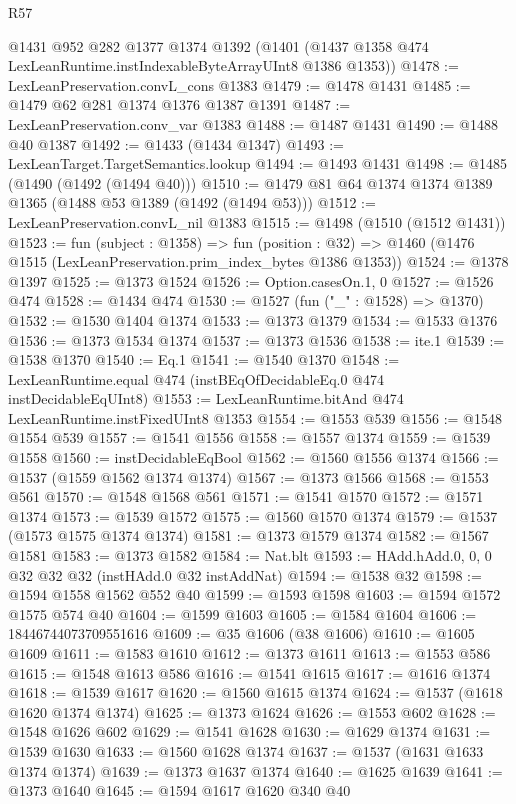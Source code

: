 \begin{lexlean}{R57}
\begin{coremodule}
    @1431
    @952
    @282
    @1377
    @1374
    @1392
    (@1401 (@1437 @1358 @474 LexLeanRuntime.instIndexableByteArrayUInt8 @1386 @1353))
@1478 := LexLeanPreservation.convL_cons @1383
@1479 := @1478 @1431
@1485 := @1479 @62 @281 @1374 @1376 @1387 @1391
@1487 := LexLeanPreservation.conv_var @1383
@1488 := @1487 @1431
@1490 := @1488 @40 @1387
@1492 := @1433 (@1434 @1347)
@1493 := LexLeanTarget.TargetSemantics.lookup
@1494 := @1493 @1431
@1498 := @1485 (@1490 (@1492 (@1494 @40)))
@1510 := @1479 @81 @64 @1374 @1374 @1389 @1365 (@1488 @53 @1389 (@1492 (@1494 @53)))
@1512 := LexLeanPreservation.convL_nil @1383
@1515 := @1498 (@1510 (@1512 @1431))
@1523 := fun (subject : @1358) =>
  fun (position : @32) => @1460 (@1476 @1515 (LexLeanPreservation.prim_index_bytes @1386 @1353))
@1524 := @1378 @1397
@1525 := @1373 @1524
@1526 := Option.casesOn.{1, 0}
@1527 := @1526 @474
@1528 := @1434 @474
@1530 := @1527 (fun ("_" : @1528) => @1370)
@1532 := @1530 @1404 @1374
@1533 := @1373 @1379
@1534 := @1533 @1376
@1536 := @1373 @1534 @1374
@1537 := @1373 @1536
@1538 := ite.{1}
@1539 := @1538 @1370
@1540 := Eq.{1}
@1541 := @1540 @1370
@1548 := LexLeanRuntime.equal @474 (instBEqOfDecidableEq.{0} @474 instDecidableEqUInt8)
@1553 := LexLeanRuntime.bitAnd @474 LexLeanRuntime.instFixedUInt8 @1353
@1554 := @1553 @539
@1556 := @1548 @1554 @539
@1557 := @1541 @1556
@1558 := @1557 @1374
@1559 := @1539 @1558
@1560 := instDecidableEqBool
@1562 := @1560 @1556 @1374
@1566 := @1537 (@1559 @1562 @1374 @1374)
@1567 := @1373 @1566
@1568 := @1553 @561
@1570 := @1548 @1568 @561
@1571 := @1541 @1570
@1572 := @1571 @1374
@1573 := @1539 @1572
@1575 := @1560 @1570 @1374
@1579 := @1537 (@1573 @1575 @1374 @1374)
@1581 := @1373 @1579 @1374
@1582 := @1567 @1581
@1583 := @1373 @1582
@1584 := Nat.blt
@1593 := HAdd.hAdd.{0, 0, 0} @32 @32 @32 (instHAdd.{0} @32 instAddNat)
@1594 := @1538 @32
@1598 := @1594 @1558 @1562 @552 @40
@1599 := @1593 @1598
@1603 := @1594 @1572 @1575 @574 @40
@1604 := @1599 @1603
@1605 := @1584 @1604
@1606 := 18446744073709551616
@1609 := @35 @1606 (@38 @1606)
@1610 := @1605 @1609
@1611 := @1583 @1610
@1612 := @1373 @1611
@1613 := @1553 @586
@1615 := @1548 @1613 @586
@1616 := @1541 @1615
@1617 := @1616 @1374
@1618 := @1539 @1617
@1620 := @1560 @1615 @1374
@1624 := @1537 (@1618 @1620 @1374 @1374)
@1625 := @1373 @1624
@1626 := @1553 @602
@1628 := @1548 @1626 @602
@1629 := @1541 @1628
@1630 := @1629 @1374
@1631 := @1539 @1630
@1633 := @1560 @1628 @1374
@1637 := @1537 (@1631 @1633 @1374 @1374)
@1639 := @1373 @1637 @1374
@1640 := @1625 @1639
@1641 := @1373 @1640
@1645 := @1594 @1617 @1620 @340 @40

\end{coremodule}
\end{lexlean}

